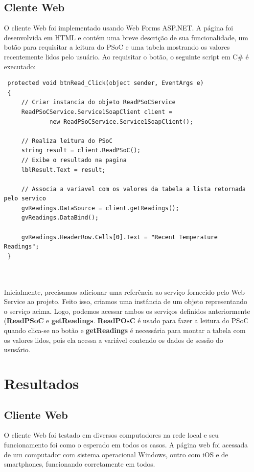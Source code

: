 \documentclass[a4paper,12pt,titlepage]{article}
\begin{document}
	
	\subsection{Clente Web}
		O cliente Web foi implementado usando Web Forms ASP.NET. A página foi desenvolvida em HTML e contém uma breve descrição de sua funcionalidade, um botão para requisitar a leitura do PSoC e uma tabela mostrando os valores recentemente lidos pelo usuário. Ao requisitar o botão, o seguinte script em C\# é executado:
			\begin{lstlisting}	
 protected void btnRead_Click(object sender, EventArgs e)
 {
	 // Criar instancia do objeto ReadPSoCService
	 ReadPSoCService.Service1SoapClient client =
			 new ReadPSoCService.Service1SoapClient();
 
	 // Realiza leitura do PSoC
	 string result = client.ReadPSoC();
	 // Exibe o resultado na pagina
	 lblResult.Text = result;
 
	 // Associa a variavel com os valores da tabela a lista retornada pelo servico
	 gvReadings.DataSource = client.getReadings();
	 gvReadings.DataBind();
 
	 gvReadings.HeaderRow.Cells[0].Text = "Recent Temperature Readings";
 }
 
 
	 		\end{lstlisting}
			Inicialmente, precisamos adicionar uma referência ao serviço fornecido pelo Web Service ao projeto. Feito isso, criamos uma instância de um objeto representando o serviço acima. Logo, podemos acessar ambos os serviços definidos anteriormente (\textbf{ReadPSoC} e \textbf{getReadings}. \textbf{ReadPOsC} é usado para fazer a leitura do PSoC quando clica-se no botão e \textbf{getReadings} é necessária para montar a tabela com os valores lidos, pois ela acessa a variável contendo os dados de sessão do ususário. 
			 
		
\section{Resultados}
	\subsection{Cliente Web}
	O cliente Web foi testado em diversos computadores na rede local e seu funcionamento foi como o esperado em todos os casos. A página web foi acessada de um computador com sistema operacional Windows, outro com iOS e de smartphones, funcionando corretamente em todos. 
	
\end{document}
